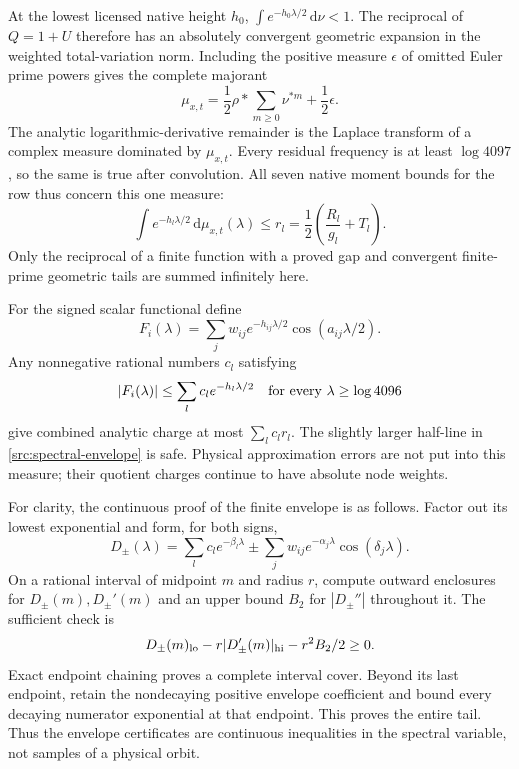 \documentclass[11pt,a4paper]{article}
\theoremstyle{definition}
\theoremstyle{remark}
\newcommand{\dd}{\mathrm d}
\begin{document}
At the lowest licensed native height $h_0$,
$\int e^{-h_0\lambda/2}\,\dd\nu<1$.  The reciprocal of $Q=1+U$
therefore has an absolutely convergent geometric expansion in the
weighted total-variation norm.  Including the positive measure
$\epsilon$ of omitted Euler prime powers gives the complete majorant
\begin{equation}
 \mu_{x,t}=\frac12\rho*\sum_{m\geq0}\nu^{*m}
                         +\frac12\epsilon.
 \label{src:positive-measure}
\end{equation}
The analytic logarithmic-derivative remainder is the Laplace transform
of a complex measure dominated by $\mu_{x,t}$.  Every residual frequency
is at least $\log4097$, so the same is true after convolution.  All seven
native moment bounds for the row thus concern this one measure:
\[
 \int e^{-h_l\lambda/2}\,\dd\mu_{x,t}(\lambda)
 \leq r_l=\frac12\left(\frac{R_l}{g_l}+T_l\right).
\]
Only the reciprocal of a finite function with a proved gap and convergent
finite-prime geometric tails are summed infinitely here.

For the signed scalar functional define
\[
 F_i(\lambda)=\sum_jw_{ij}e^{-h_{ij}\lambda/2}
                                     \cos(a_{ij}\lambda/2).
\]
Any nonnegative rational numbers $c_l$ satisfying
\begin{equation}
 |F_i(\lambda)|\leq\sum_lc_le^{-h_l\lambda/2}
 \quad\hbox{for every }\lambda\geq\log4096
 \label{src:spectral-envelope}
\end{equation}
give combined analytic charge at most $\sum_lc_lr_l$.
The slightly larger half-line in \eqref{src:spectral-envelope} is safe.
Physical approximation errors are not put into this measure; their
quotient charges continue to have absolute node weights.

For clarity, the continuous proof of the finite envelope is as follows.
Factor out its lowest exponential and form, for both signs,
\[
 D_\pm(\lambda)=\sum_lc_le^{-\beta_l\lambda}
       \pm\sum_jw_{ij}e^{-\alpha_j\lambda}\cos(\delta_j\lambda).
\]
On a rational interval of midpoint $m$ and radius $r$, compute outward
enclosures for $D_\pm(m),D_\pm'(m)$ and an upper bound $B_2$ for
$|D_\pm''|$ throughout it.  The sufficient check is
\[
 D_\pm(m)_{\rm lo}-r|D_\pm'(m)|_{\rm hi}-r^2B_2/2\geq0.
\]
Exact endpoint chaining proves a complete interval cover.  Beyond its
last endpoint, retain the nondecaying positive envelope coefficient and
bound every decaying numerator exponential at that endpoint.  This
proves the entire tail.  Thus the envelope certificates are continuous
inequalities in the spectral variable, not samples of a physical orbit.
\end{document}
